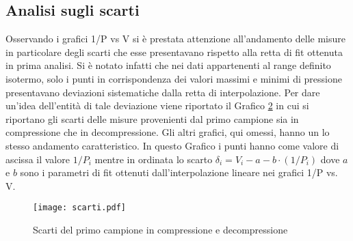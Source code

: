 \documentclass[a4paper,11pt,oneside]{article}
\begin{document}
\begin{figure}[h!]
    \centering
    \caption*{}
    \label{fig:my_label}
\end{figure}
\subsection{Analisi sugli scarti}
Osservando i grafici 1/P vs V si è prestata attenzione all'andamento delle misure in particolare degli scarti che esse presentavano rispetto alla retta di fit ottenuta in prima analisi. Si è notato infatti che nei dati appartenenti al range definito isotermo, solo i punti in corrispondenza dei valori massimi e minimi di pressione presentavano deviazioni sistematiche dalla retta di interpolazione. Per dare un'idea dell'entità di tale deviazione viene riportato il Grafico \ref{fig:scarti} in cui si riportano gli scarti delle misure provenienti dal primo campione sia in compressione che in decompressione. Gli altri grafici, qui omessi, hanno un lo stesso andamento caratteristico. In questo Grafico i punti hanno come valore di ascissa il valore $1/P_{i}$ mentre in ordinata lo scarto $\delta_{i}=V_{i} - a - b \cdot (1/P_{i})$ dove $a$ e $b$ sono i parametri di fit ottenuti dall'interpolazione lineare nei grafici 1/P vs. V.

\begin{figure}
    \centering
    \texttt{[image: scarti.pdf]}
    \caption{Scarti del primo campione in compressione e decompressione}
    \label{fig:scarti}
\end{figure}
\end{document}

